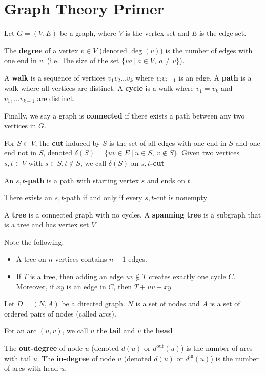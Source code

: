 \documentclass[../main.tex]{subfiles}
\begin{document}
\section{Graph Theory Primer}
Let $G = (V, E)$ be a graph, where $V$ is the vertex set and $E$ is the edge set.
\begin{definition}
   The \textbf{degree} of a vertex $v \in V$ (denoted $\deg(v)$) is the number of edges with one end in $v$. (i.e. The size of the set $\{ va \:\rvert\: a \in V, \ a \neq v \}$).

   A \textbf{walk} is a sequence of vertices $v_1v_2\ldots v_k$ where $v_iv_{i+1}$ is an edge. A \textbf{path} is a walk where all vertices are distinct. A \textbf{cycle} is a walk where $v_1 = v_k$ and $v_1, \ldots v_{k-1}$ are distinct.

   Finally, we say a graph is \textbf{connected} if there exists a path between any two vertices in $G$.
\end{definition}

\begin{definition}
  For $S \subset V$, the \textbf{cut} induced by $S$ is the set of all edges with one end in $S$ and one end not in $S$, denoted $\delta(S) = \{uv \in E \:\rvert\: u \in S, \ v \not\in S \}$. Given two vertices $s, t \in V$ with $s \in S, t \not\in S$, we call $\delta(S)$ an \textbf{$s,t$-cut}

  An \textbf{$s,t$-path} is a path with starting vertex $s$ and ends on $t$.
\end{definition}

\begin{theorem}
  There exists an $s,t$-path if and only if every $s,t$-cut is nonempty
\end{theorem}

\begin{definition}
  A \textbf{tree} is a connected graph with no cycles. A \textbf{spanning tree} is a subgraph that is a tree and has vertex set $V$
\end{definition}
Note the following:
\begin{itemize}
  \item A tree on $n$ vertices contains $n-1$ edges.
  \item If $T$ is a tree, then adding an edge $uv \not\in T$ creates exactly one cycle $C$. Moreover, if $xy$ is an edge in $C$, then $T + uv - xy$
\end{itemize}

Let $D = (N, A)$ be a directed graph. $N$ is a set of nodes and $A$ is a set of ordered pairs of nodes (called arcs).

\begin{definition}
  For an arc $(u,v)$, we call $u$ the \textbf{tail} and $v$ the \textbf{head}
\end{definition}

\begin{definition}
  The \textbf{out-degree} of node $u$ (denoted $d(u)$ or $d^{\text{out}}(u)$) is the number of arcs with tail $u$. The \textbf{in-degree} of node $u$ (denoted $d(\overline{u})$ or $d^{\text{in}}(u)$) is the number of arcs with head $u$.
\end{definition}
\end{document}
